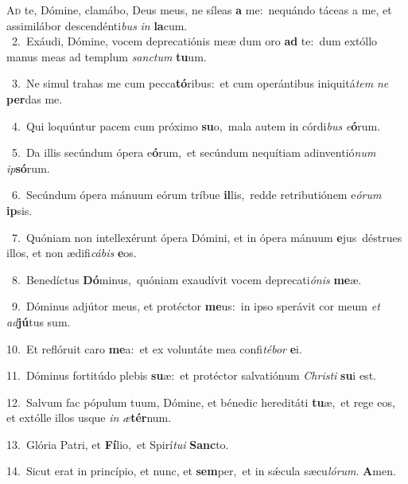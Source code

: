 \lettrine{\initial\textcolor{\initialcolor}{A}}{d} te, Dómine, clamábo, Deus meus, ne síleas \textbf{a} me:~\star nequándo táceas a me, et assimilábor descendénti\textit{bus} \textit{in} \textbf{la}\-cum.\\
{\numbfont\textcolor{\numbcolor}{~2.}}~Exáudi, Dómine, vocem deprecatiónis meæ dum oro \textbf{ad} te:~\star dum extóllo manus meas ad templum \textit{sanc}\-\textit{tum} \textbf{tu}\-um.\par
{\numbfont\textcolor{\numbcolor}{~3.}}~Ne simul trahas me cum pecca\-\textbf{tó}\-ribus:~\star et cum operántibus iniquitá\textit{tem} \textit{ne} \textbf{per}\-das me.\par
{\numbfont\textcolor{\numbcolor}{~4.}}~Qui loquúntur pacem cum próximo \textbf{su}\-o,~\star mala autem in córdi\textit{bus} \textit{e}\-\textbf{ó}rum.\par
{\numbfont\textcolor{\numbcolor}{~5.}}~Da illis secúndum ópera e\-\textbf{ó}\-rum,~\star et secúndum nequítiam adinventió\textit{num} \textit{ip}\-\textbf{só}rum.\par
{\numbfont\textcolor{\numbcolor}{~6.}}~Secúndum ópera mánuum eórum tríbue \textbf{il}\-lis,~\star redde retributiónem e\-\textit{ó}\-\textit{rum} \textbf{ip}\-sis.\par
{\numbfont\textcolor{\numbcolor}{~7.}}~Quóniam non intellexérunt ópera Dómini, et in ópera mánuum \textbf{e}\-jus~\star déstrues illos, et non ædifi\-\textit{cá}\-\textit{bis} \textbf{e}\-os.\par
{\numbfont\textcolor{\numbcolor}{~8.}}~Benedíctus \textbf{Dó}\-minus,~\star quóniam exaudívit vocem deprecati\-\textit{ó}\-\textit{nis} \textbf{me}\-æ.\par
{\numbfont\textcolor{\numbcolor}{~9.}}~Dóminus adjútor meus, et protéctor \textbf{me}\-us:~\star in ipso sperávit cor meum \textit{et} \textit{ad}\-\textbf{jú}tus sum.\par
{\numbfont\textcolor{\numbcolor}{10.}}~Et reflóruit caro \textbf{me}\-a:~\star et ex voluntáte mea confi\-\textit{té}\-\textit{bor} \textbf{e}\-i.\par
{\numbfont\textcolor{\numbcolor}{11.}}~Dóminus fortitúdo plebis \textbf{su}\-æ:~\star et protéctor salvatiónum \textit{Chris}\-\textit{ti} \textbf{su}\-i est.\par
{\numbfont\textcolor{\numbcolor}{12.}}~Salvum fac pópulum tuum, Dómine, et bénedic hereditáti \textbf{tu}\-æ,~\star et rege eos, et extólle illos usque \textit{in} \textit{æ}\-\textbf{tér}num.\par
{\numbfont\textcolor{\numbcolor}{13.}}~Glória Patri, et \textbf{Fí}\-lio,~\star et Spirí\-\textit{tu}\-\textit{i} \textbf{Sanc}\-to.\par
{\numbfont\textcolor{\numbcolor}{14.}}~Sicut erat in princípio, et nunc, et \textbf{sem}\-per,~\star et in sǽcula sæcu\-\textit{ló}\-\textit{rum}. \textbf{A}\-men.\par

